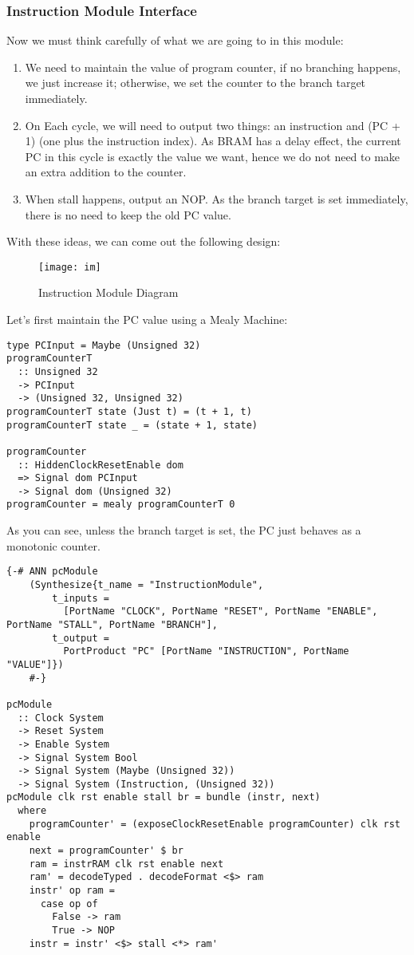 \subsubsection{Instruction Module Interface}
Now we must think carefully of what we are going to in this module:
\begin{enumerate}
	\item We need to maintain the value of program counter, if no branching happens, we just increase it; otherwise, we set the counter to the branch target immediately.
	\item On Each cycle, we will need to output two things: an instruction and (PC + 1) (one plus the instruction index). As BRAM has a delay effect, the current PC in this cycle is exactly the value we want, hence we do not need to make an extra addition to the counter.
	\item When stall happens, output an NOP. As the branch target is set immediately, there is no need to keep the old PC value.
\end{enumerate}
With these ideas, we can come out the following design:
\begin{figure}[H]
	\centering
	\texttt{[image: im]}
	\caption{Instruction Module Diagram}
\end{figure}
Let's first maintain the PC value using a Mealy Machine:    
\begin{verbatim}
type PCInput = Maybe (Unsigned 32)
programCounterT 
  :: Unsigned 32 
  -> PCInput
  -> (Unsigned 32, Unsigned 32)
programCounterT state (Just t) = (t + 1, t)
programCounterT state _ = (state + 1, state)

programCounter 
  :: HiddenClockResetEnable dom
  => Signal dom PCInput
  -> Signal dom (Unsigned 32)
programCounter = mealy programCounterT 0
\end{verbatim}
As you can see, unless the branch target is set, the PC just behaves as a monotonic counter.
\begin{verbatim}
{-# ANN pcModule
    (Synthesize{t_name = "InstructionModule",
        t_inputs =
          [PortName "CLOCK", PortName "RESET", PortName "ENABLE", PortName "STALL", PortName "BRANCH"],
        t_output =
          PortProduct "PC" [PortName "INSTRUCTION", PortName "VALUE"]})
    #-}

pcModule 
  :: Clock System
  -> Reset System
  -> Enable System
  -> Signal System Bool
  -> Signal System (Maybe (Unsigned 32))
  -> Signal System (Instruction, (Unsigned 32))
pcModule clk rst enable stall br = bundle (instr, next)
  where
    programCounter' = (exposeClockResetEnable programCounter) clk rst enable
    next = programCounter' $ br
    ram = instrRAM clk rst enable next
    ram' = decodeTyped . decodeFormat <$> ram
    instr' op ram =
      case op of
        False -> ram
        True -> NOP
    instr = instr' <$> stall <*> ram'
\end{verbatim}
